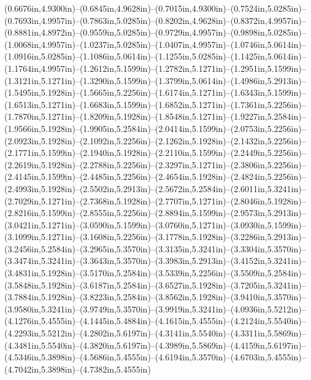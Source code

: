 (0.6676in,4.9300in)--(0.6845in,4.9628in)--(0.7015in,4.9300in)--(0.7524in,5.0285in)--(0.7693in,4.9957in)--(0.7863in,5.0285in)--(0.8202in,4.9628in)--(0.8372in,4.9957in)--(0.8881in,4.8972in)--(0.9559in,5.0285in)--(0.9729in,4.9957in)--(0.9898in,5.0285in)--(1.0068in,4.9957in)--(1.0237in,5.0285in)--(1.0407in,4.9957in)--(1.0746in,5.0614in)--(1.0916in,5.0285in)--(1.1086in,5.0614in)--(1.1255in,5.0285in)--(1.1425in,5.0614in)--(1.1764in,4.9957in)--(1.2612in,5.1599in)--(1.2782in,5.1271in)--(1.2951in,5.1599in)--(1.3121in,5.1271in)--(1.3290in,5.1599in)--(1.3799in,5.0614in)--(1.4986in,5.2913in)--(1.5495in,5.1928in)--(1.5665in,5.2256in)--(1.6174in,5.1271in)--(1.6343in,5.1599in)--(1.6513in,5.1271in)--(1.6683in,5.1599in)--(1.6852in,5.1271in)--(1.7361in,5.2256in)--(1.7870in,5.1271in)--(1.8209in,5.1928in)--(1.8548in,5.1271in)--(1.9227in,5.2584in)--(1.9566in,5.1928in)--(1.9905in,5.2584in)--(2.0414in,5.1599in)--(2.0753in,5.2256in)--(2.0923in,5.1928in)--(2.1092in,5.2256in)--(2.1262in,5.1928in)--(2.1432in,5.2256in)--(2.1771in,5.1599in)--(2.1940in,5.1928in)--(2.2110in,5.1599in)--(2.2449in,5.2256in)--(2.2619in,5.1928in)--(2.2788in,5.2256in)--(2.3297in,5.1271in)--(2.3806in,5.2256in)--(2.4145in,5.1599in)--(2.4485in,5.2256in)--(2.4654in,5.1928in)--(2.4824in,5.2256in)--(2.4993in,5.1928in)--(2.5502in,5.2913in)--(2.5672in,5.2584in)--(2.6011in,5.3241in)--(2.7029in,5.1271in)--(2.7368in,5.1928in)--(2.7707in,5.1271in)--(2.8046in,5.1928in)--(2.8216in,5.1599in)--(2.8555in,5.2256in)--(2.8894in,5.1599in)--(2.9573in,5.2913in)--(3.0421in,5.1271in)--(3.0590in,5.1599in)--(3.0760in,5.1271in)--(3.0930in,5.1599in)--(3.1099in,5.1271in)--(3.1608in,5.2256in)--(3.1778in,5.1928in)--(3.2286in,5.2913in)--(3.2456in,5.2584in)--(3.2965in,5.3570in)--(3.3135in,5.3241in)--(3.3304in,5.3570in)--(3.3474in,5.3241in)--(3.3643in,5.3570in)--(3.3983in,5.2913in)--(3.4152in,5.3241in)--(3.4831in,5.1928in)--(3.5170in,5.2584in)--(3.5339in,5.2256in)--(3.5509in,5.2584in)--(3.5848in,5.1928in)--(3.6187in,5.2584in)--(3.6527in,5.1928in)--(3.7205in,5.3241in)--(3.7884in,5.1928in)--(3.8223in,5.2584in)--(3.8562in,5.1928in)--(3.9410in,5.3570in)--(3.9580in,5.3241in)--(3.9749in,5.3570in)--(3.9919in,5.3241in)--(4.0936in,5.5212in)--(4.1276in,5.4555in)--(4.1445in,5.4884in)--(4.1615in,5.4555in)--(4.2124in,5.5540in)--(4.2293in,5.5212in)--(4.2802in,5.6197in)--(4.3141in,5.5540in)--(4.3311in,5.5869in)--(4.3481in,5.5540in)--(4.3820in,5.6197in)--(4.3989in,5.5869in)--(4.4159in,5.6197in)--(4.5346in,5.3898in)--(4.5686in,5.4555in)--(4.6194in,5.3570in)--(4.6703in,5.4555in)--(4.7042in,5.3898in)--(4.7382in,5.4555in) 